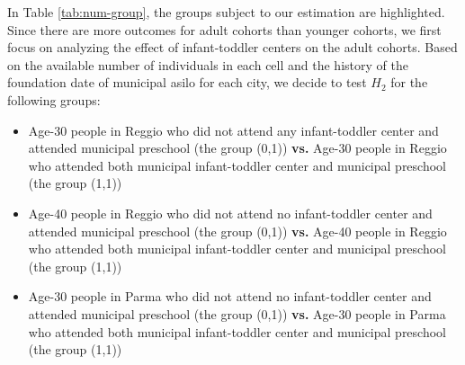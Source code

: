 \begin{table}[H] \caption{Number of Individuals in Each Group} \label{tab:num-group}
\end{table}

In Table \ref{tab:num-group}, the groups subject to our estimation are highlighted. Since there are more outcomes for adult cohorts than younger cohorts, we first focus on analyzing the effect of infant-toddler centers on the adult cohorts. Based on the available number of individuals in each cell and the history of the foundation date of municipal asilo for each city, we decide to test $H_2$ for the following groups:
\begin{itemize}
\item Age-30 people in Reggio who did not attend any infant-toddler center and attended municipal preschool (the group (0,1)) \textbf{vs.} Age-30 people in Reggio who attended both municipal infant-toddler center and municipal preschool (the group (1,1))
\item Age-40 people in Reggio who did not attend no infant-toddler center and attended municipal preschool (the group (0,1)) \textbf{vs.} Age-40 people in Reggio who attended both municipal infant-toddler center and municipal preschool (the group (1,1))
\item Age-30 people in Parma who did not attend no infant-toddler center and attended municipal preschool (the group (0,1)) \textbf{vs.} Age-30 people in Parma who attended both municipal infant-toddler center and municipal preschool (the group (1,1))
\end{itemize}

